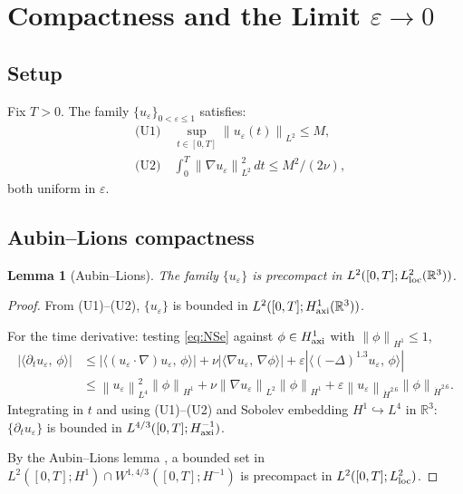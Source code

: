 \documentclass{article}
\newtheorem{lemma}[theorem]{Lemma}
\theoremstyle{definition}
\theoremstyle{remark}
\newcommand{\R}{\mathbb{R}}
\newcommand{\e}{\varepsilon}
\newcommand{\norm}[1]{\left\|#1\right\|}
\newcommand{\inner}[2]{\langle #1,\, #2\rangle}
\begin{document}
\section{Compactness and the Limit \texorpdfstring{$\e\to 0$}{epsilon to 0}}
\label{sec:compact}

\subsection{Setup}

Fix $T > 0$.  The family $\{u_\e\}_{0<\e\le 1}$ satisfies:
\begin{align}
  &\text{(U1)}\quad \sup_{t\in[0,T]}\norm{u_\e(t)}_{L^2} \le M,
    \label{U1}\\
  &\text{(U2)}\quad \int_0^T\norm{\nabla u_\e}_{L^2}^2\,dt
    \le M^2/(2\nu),
    \label{U2}
\end{align}
both uniform in $\e$.

\subsection{Aubin--Lions compactness}

\begin{lemma}[Aubin--Lions]\label{lem:aubin}
  The family $\{u_\e\}$ is precompact in $L^2([0,T];L^2_{\rm loc}(\R^3))$.
\end{lemma}
\begin{proof}
  From (U1)--(U2), $\{u_\e\}$ is bounded in
  $L^2([0,T];H^1_{\rm axi}(\R^3))$.

  For the time derivative: testing \eqref{eq:NSe} against
  $\phi\in H^1_{\rm axi}$ with $\norm{\phi}_{H^1}\le 1$,
  \begin{align*}
    |\inner{\partial_t u_\e}{\phi}|
    &\le |\inner{(u_\e\cdot\nabla)u_\e}{\phi}|
      + \nu|\inner{\nabla u_\e}{\nabla\phi}|
      + \e|\inner{(-\Delta)^{1.3}u_\e}{\phi}|\\
    &\le \norm{u_\e}_{L^4}^2\norm{\phi}_{H^1}
      + \nu\norm{\nabla u_\e}_{L^2}\norm{\phi}_{H^1}
      + \e\norm{u_\e}_{\dot H^{2.6}}\norm{\phi}_{\dot H^{2.6}}.
  \end{align*}
  Integrating in $t$ and using (U1)--(U2) and Sobolev embedding
  $H^1\hookrightarrow L^4$ in $\R^3$:  $\{\partial_t u_\e\}$ is
  bounded in $L^{4/3}([0,T];H^{-1}_{\rm axi})$.

  By the Aubin--Lions lemma \cite{Aubin1963,Lions1969}, a bounded set in
  $L^2([0,T];H^1)\cap W^{1,4/3}([0,T];H^{-1})$ is precompact in
  $L^2([0,T];L^2_{\rm loc})$.
\end{proof}
\end{document}
